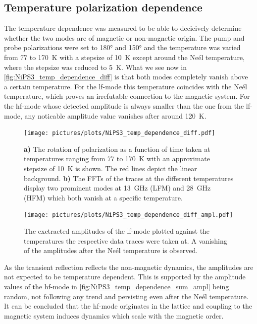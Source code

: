 \subsection{Temperature polarization dependence}
The temperature dependence was measured to be able to decicively determine whether the two modes are of magnetic or non-magnetic origin.
The pump and probe polarizations were set to 180° and 150° and the temperature was varied from 77 to \qty{170}{K} with a stepsize of \qty{10}{K} except around the Neél temperature, where the stepsize was reduced to \qty{5}{K}.
What we see now in \autoref{fig:NiPS3_temp_dependence_diff} is that both modes completely vanish above a certain temperature.
For the lf-mode this temperature coincides with the Neél temperature, which proves an irrefutable connection to the magnetic system.
For the hf-mode whose detected amplitude is always smaller than the one from the lf-mode, any noticable amplitude value vanishes after around \qty{120}{K}.
\begin{figure}[hbt!]
    \centering
    \texttt{[image: pictures/plots/NiPS3\_temp\_dependence\_diff.pdf]} \vspace{-0.3cm}
    \caption{\textbf{a)} The rotation of polarization as a function of time taken at temperatures ranging from 77 to \qty{170}{K} with an approximate stepsize of \qty{10}{K} is shown. The red lines depict the linear background. \textbf{b)} The FFTs of the traces at the different temperatures display two prominent modes at \qty{13}{GHz} (LFM) and \qty{28}{GHz} (HFM) which both vanish at a specific temperature.}
    \label{fig:NiPS3_temp_dependence_diff}
\end{figure}
\begin{figure}[hbt!]
    \centering  
    \texttt{[image: pictures/plots/NiPS3\_temp\_dependence\_diff\_ampl.pdf]} \vspace{-0.3cm}
    \caption{The exctracted amplitudes of the lf-mode plotted against the temperatures the respective data traces were taken at. A vanishing of the amplitudes after the Neél temperature is observed.}
    \label{fig:NiPS3_temp_dependence_diff_ampl}
\end{figure}
\FloatBarrier
As the transient reflection reflects the non-magnetic dynamics, the amplitudes are not expected to be temperature dependent.
This is supported by the amplitude values of the hf-mode in \autoref{fig:NiPS3_temp_dependence_sum_ampl} being random, not following any trend and persisting even after the Neél temperature.
It can be concluded that the hf-mode originates in the lattice and coupling to the magnetic system induces dynamics which scale with the magnetic order.
